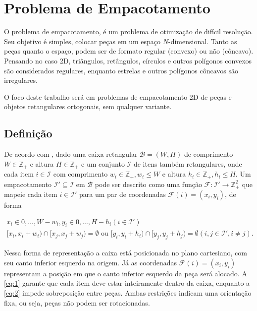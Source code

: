\chapter{Problema de Empacotamento}\label{ch:problema-de-empacotamento}

O problema de empacotamento, é um problema de otimização de difícil resolução.
Seu objetivo é simples, colocar peças em um espaço $N$-dimensional.
Tanto as peças quanto o espaço, podem ser de formato regular (convexo) ou não (côncavo).
Pensando no caso 2D, triângulos, retângulos, círculos e outros polígonos convexos são considerados regulares, enquanto estrelas e outros polígonos côncavos são irregulares.

O foco deste trabalho será em problemas de empacotamento 2D de peças e objetos retangulares ortogonais, sem qualquer variante.


\section{Definição}\label{sec:definicao}

De acordo com \citeauthor{2DPackLib}, dado uma caixa retangular $\mathcal{B} = (W, H)$ de comprimento $W \in \mathbb{Z}_+$ e altura $H \in \mathbb{Z}_+$ e um conjunto $\mathcal{I}$ de itens também retangulares, onde cada item $i \in \mathcal{I}$ com comprimento $w_i \in \mathbb{Z}_+, w_i \le W$ e altura $h_i \in \mathbb{Z}_+, h_i \le H$.
Um empacotamento $\mathcal{I}' \subseteq \mathcal{I}$ em $\mathcal{B}$ pode ser descrito como uma função $\mathcal{F}: \mathcal{I}' \to \mathbb{Z}_+^2$ que mapeie cada item $i \in \mathcal{I}'$ para um par de coordenadas $\mathcal{F}(i) = (x_i, y_i)$, de forma

\begin{align}
    x_i \in {0, \dots, W - w_i}, y_i \in {0, \dots, H - h_i} (i \in \mathcal{I}') \label{eq:1} \\
    [x_i, x_i + w_i) \cap [x_j, x_j + w_j) = \emptyset \text{ ou } [y_i, y_i + h_i) \cap [y_j, y_j + h_j) = \emptyset (i, j \in \mathcal{I}', i \neq j) \label{eq:2}.
\end{align}

Nessa forma de representação a caixa está posicionada no plano cartesiano, com seu canto inferior esquerdo na origem.
Já as coordenadas $\mathcal{F}(i) = (x_i, y_i)$ representam a posição em que o canto inferior esquerdo da peça será alocado.
A \autoref{eq:1} garante que cada item deve estar inteiramente dentro da caixa, enquanto a \autoref{eq:2} impede sobreposição entre peças.
Ambas restrições indicam uma orientação fixa, ou seja, peças não podem ser rotacionadas.


